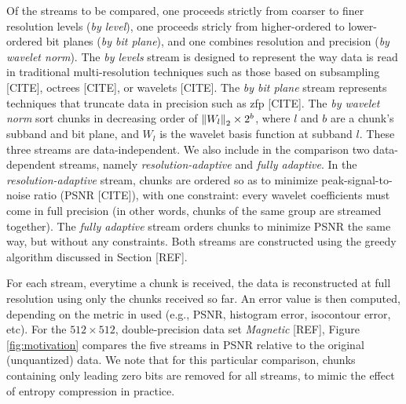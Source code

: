 Of the streams to be compared, one proceeds strictly from coarser to finer resolution levels
(\emph{by level}), one proceeds stricly from higher-ordered to lower-ordered bit planes (\emph{by
bit plane}), and one combines resolution and precision (\emph{by wavelet norm}). The \emph{by
levels} stream is designed to represent the way data is read in traditional multi-resolution
techniques such as those based on subsampling [CITE], octrees [CITE], or wavelets [CITE]. The
\emph{by bit plane} stream represents techniques that truncate data in precision such as zfp [CITE].
The \emph{by wavelet norm} sort chunks in decreasing order of $\left\lVert W_l\right\rVert_2 \times 2^b$, where $l$
and $b$ are a chunk's subband and bit plane, and $W_l$ is the wavelet basis function at subband $l$.
These three streams are data-independent. We also include in the comparison two data-dependent
streams, namely \emph{resolution-adaptive} and \emph{fully adaptive}. In the
\emph{resolution-adaptive} stream, chunks are ordered so as to minimize peak-signal-to-noise ratio
(PSNR [CITE]), with one constraint: every wavelet coefficients must come in full precision (in other
words, chunks of the same group are streamed together). The \emph{fully adaptive} stream orders
chunks to minimize PSNR the same way, but without any constraints. Both streams are constructed
using the greedy algorithm discussed in Section [REF].

For each stream, everytime a chunk is received, the data is reconstructed at full resolution using
only the chunks received so far. An error value is then computed, depending on the metric in used
(e.g., PSNR, histogram error, isocontour error, etc). For the $512 \times 512$, double-precision
data set \emph{Magnetic} [REF], Figure \ref{fig:motivation} compares the five streams in
PSNR relative to the original (unquantized) data. We note that for this particular comparison,
chunks containing only leading zero bits are removed for all streams, to mimic the effect of entropy
compression in practice.

